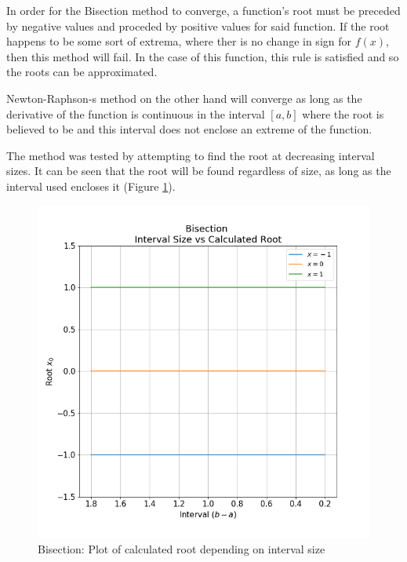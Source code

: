 \documentclass[twocolumn]{article}
\begin{document}
In order for the Bisection method to converge, a function's root must be preceded by negative values and proceded by positive values for said
function. If the root happens to be some sort of extrema, where ther is no change in sign for $f(x)$, then this method will fail.
In the case of this function, this rule is satisfied and so the roots can be approximated.

Newton-Raphson-s method on the other hand will converge as long as the derivative of the function is continuous in the interval $[a,b]$
where the root is believed to be and this interval does not enclose an extreme of the function.

The method was tested by attempting to find the root at decreasing interval sizes. It can be seen that
the root will be found regardless of size, as long as the interval used encloses it (Figure \ref{fig:f3_bitest}).
\begin{figure}[h!]
 \centering
 \includegraphics[scale = 0.4]{f3_bitest}
 \caption{Bisection: Plot of calculated root depending on interval size}
 \label{fig:f3_bitest}
\end{figure}
\end{document}
